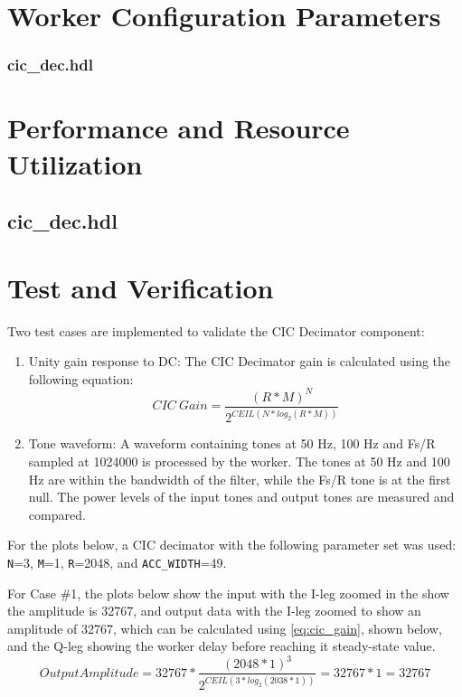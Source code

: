 \documentclass{article}
\def\comp{cic\_dec}
\edef\ecomp{cic_dec}
\begin{document}
\begin{landscape}
\section*{Worker Configuration Parameters}
\subsubsection*{\comp.hdl}

\section*{Performance and Resource Utilization}
\subsection*{\comp.hdl}

\end{landscape}
\newpage
\section*{Test and Verification}
Two test cases are implemented to validate the CIC Decimator component:

\begin{enumerate}
	\item Unity gain response to DC: The CIC Decimator gain is calculated using the following equation:
	      \begin{equation} \label{eq:cic_gain}
	      	CIC\ Gain = \frac{(R*M)^N}{2^{CEIL(N*log_2(R*M))}}
	      \end{equation}
	\item Tone waveform: A waveform containing tones at 50 Hz, 100 Hz and Fs/R sampled at 1024000 is processed by the worker. The tones at 50 Hz and 100 Hz are within the bandwidth of the filter, while the Fs/R tone is at the first null. The power levels of the input tones and output tones are measured and compared.
\end{enumerate}\medskip

For the plots below, a CIC decimator with the following parameter set was used: \verb+N+=3, \verb+M+=1, \verb+R+=2048, and \verb+ACC_WIDTH+=49.\bigskip

\newpage
	For Case \#1, the plots below show the input with the I-leg zoomed in the show the amplitude is 32767, and output data with the I-leg zoomed to show an amplitude of 32767, which can be calculated using \ref{eq:cic_gain}, shown below, and the Q-leg showing the worker delay before reaching it steady-state value.
		  \begin{equation} \label{eq:cic_gain_applied}
	      	Output Amplitude = 32767*\frac{(2048*1)^3}{2^{CEIL(3*log_2(2038*1))}} = 32767*1=32767
	      \end{equation}
\end{document}
